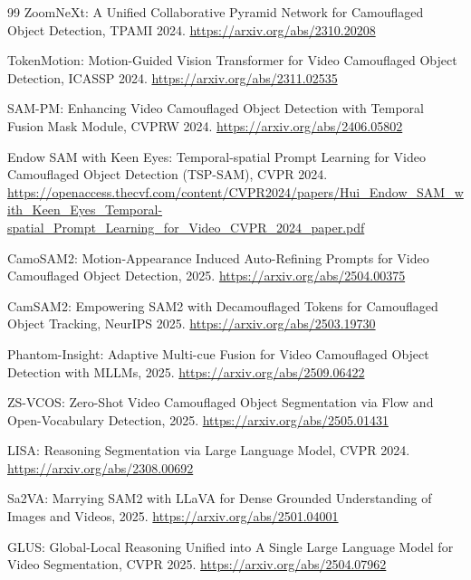 \documentclass[11pt]{article}
\begin{document}
\begin{thebibliography}{99}
ZoomNeXt: A Unified Collaborative Pyramid Network for Camouflaged Object Detection, TPAMI 2024.\newline
\url{https://arxiv.org/abs/2310.20208}

TokenMotion: Motion-Guided Vision Transformer for Video Camouflaged Object Detection, ICASSP 2024.\newline
\url{https://arxiv.org/abs/2311.02535}

SAM-PM: Enhancing Video Camouflaged Object Detection with Temporal Fusion Mask Module, CVPRW 2024.\newline
\url{https://arxiv.org/abs/2406.05802}

Endow SAM with Keen Eyes: Temporal-spatial Prompt Learning for Video Camouflaged Object Detection (TSP-SAM), CVPR 2024.\newline
\url{https://openaccess.thecvf.com/content/CVPR2024/papers/Hui_Endow_SAM_with_Keen_Eyes_Temporal-spatial_Prompt_Learning_for_Video_CVPR_2024_paper.pdf}

CamoSAM2: Motion-Appearance Induced Auto-Refining Prompts for Video Camouflaged Object Detection, 2025.\newline
\url{https://arxiv.org/abs/2504.00375}

CamSAM2: Empowering SAM2 with Decamouflaged Tokens for Camouflaged Object Tracking, NeurIPS 2025.\newline
\url{https://arxiv.org/abs/2503.19730}

Phantom-Insight: Adaptive Multi-cue Fusion for Video Camouflaged Object Detection with MLLMs, 2025.\newline
\url{https://arxiv.org/abs/2509.06422}

ZS-VCOS: Zero-Shot Video Camouflaged Object Segmentation via Flow and Open-Vocabulary Detection, 2025.\newline
\url{https://arxiv.org/abs/2505.01431}

LISA: Reasoning Segmentation via Large Language Model, CVPR 2024.\newline
\url{https://arxiv.org/abs/2308.00692}

Sa2VA: Marrying SAM2 with LLaVA for Dense Grounded Understanding of Images and Videos, 2025.\newline
\url{https://arxiv.org/abs/2501.04001}

GLUS: Global-Local Reasoning Unified into A Single Large Language Model for Video Segmentation, CVPR 2025.\newline
\url{https://arxiv.org/abs/2504.07962}


\end{thebibliography}
\end{document}
